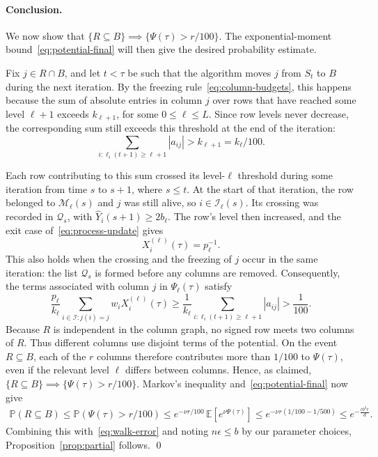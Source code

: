 \documentclass[reqno]{amsart}
\theoremstyle{definition}
\newcommand{\E}{\mathbb E}
\newcommand{\Prob}{\mathbb P}
\begin{document}
\paragraph{Conclusion.}
We now show that $\{R\subseteq B\} \implies \{\Psi(\tau)>r/100\}$. The exponential-moment bound~\eqref{eq:potential-final} will then give the desired probability estimate.

Fix $j\in R\cap B$, and let $t<\tau$ be such that the algorithm moves $j$ from $S_t$ to $B$ during the next iteration. By the freezing rule~\eqref{eq:column-budgets}, this happens because the sum of absolute entries in column $j$ over rows that have reached some level $\ell+1$ exceeds $k_{\ell+1}$, for some $0\le\ell\le L$. Since row levels never decrease, the corresponding sum still exceeds this threshold at the end of the iteration:
\[ \sum_{i:\ell_i(t+1)\ge\ell+1}|a_{ij}| >k_{\ell+1}=k_\ell/100. \]

Each row contributing to this sum crossed its level-$\ell$ threshold during some iteration from time $s$ to $s+1$, where $s\le t$. At the start of that iteration, the row belonged to $\mathcal M_\ell(s)$ and $j$ was still alive, so $i\in\mathcal I_\ell(s)$. Its crossing was recorded in $\mathcal Q_s$, with $\widehat Y_i(s+1)\ge2b_\ell$. The row's level then increased, and the exit case of~\eqref{eq:process-update} gives
\[ X_i^{(\ell)}(\tau)=p_\ell^{-1}. \]
This also holds when the crossing and the freezing of $j$ occur in the same iteration: the list $\mathcal Q_s$ is formed before any columns are removed. Consequently, the terms associated with column $j$ in $\Psi_\ell(\tau)$ satisfy
\[ \frac{p_\ell}{k_\ell} \sum_{i\in\mathcal I:j(i)=j} w_iX_i^{(\ell)}(\tau) \ge \frac{1}{k_\ell} \sum_{i:\ell_i(t+1)\ge\ell+1}|a_{ij}| >\frac1{100}. \]
Because $R$ is independent in the column graph, no signed row meets two columns of $R$. Thus different columns use disjoint terms of the potential. On the event $R\subseteq B$, each of the $r$ columns therefore contributes more than $1/100$ to $\Psi(\tau)$, even if the relevant level $\ell$ differs between columns. Hence, as claimed, $\{R\subseteq B\} \implies \{\Psi(\tau)>r/100\}$. Markov's inequality and~\eqref{eq:potential-final} now give
\[ \begin{aligned} \Prob(R\subseteq B) \le \Prob(\Psi(\tau)>r/100) \le e^{-\nu r/100}\,\E[ e^{\nu\Psi(\tau)}] \le e^{-\nu r(1/100-1/500)} \le e^{-\frac{cb^3r}d}. \end{aligned} \]
Combining this with~\eqref{eq:walk-error} and noting $n\epsilon\le b$ by our parameter choices, Proposition~\ref{prop:partial} follows. \qed
\end{document}
